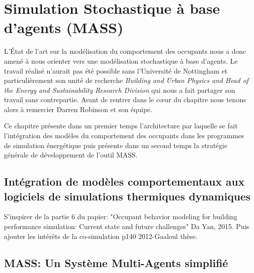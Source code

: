 \chapter{Simulation Stochastique à base d'agents (MASS)}
\label{MASS}

L'État de l'art sur la modélisation du comportement des occupants nous a donc amené à nous orienter vers une modélisation stochastique à base d'agents. Le travail réalisé n'aurait pas été possible sans l'Université de Nottingham et particulièrement son unité de recherche \textit{Building and Urban Physics and Head of the Energy and Sustainability Research Division} qui nous a fait partager son travail sans contrepartie. Avant de rentrer dans le cœur du chapitre nous tenons alors à remercier Darren Robinson et son équipe. 

Ce chapitre présente dans un premier temps l'architecture par laquelle se fait l'intégration des modèles du comportement des occupants dans les programmes de simulation énergétique puis présente dans un second temps la stratégie générale de développement de l'outil MASS.

\section{Intégration de modèles comportementaux aux logiciels de simulations thermiques dynamiques}

S'inspirer de la partie 6 du papier: "Occupant behavior modeling for building performance simulation: Current state and future challenges"  Da Yan, 2015. Puis ajouter les intérêts de la co-simulation p140 2012-Gaaloul thèse.



\section{MASS: Un Système Multi-Agents simplifié}

